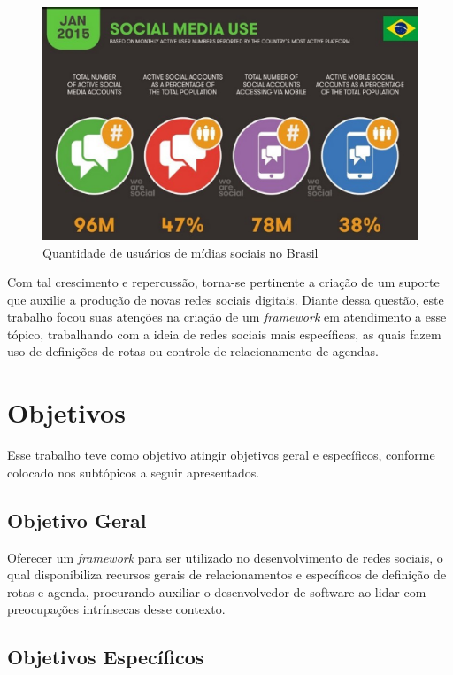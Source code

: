 \begin{figure}[!h]
	\centering
	\includegraphics[scale=0.4]{figuras/introducao/brasil.eps}
	\caption[Quantidade de usuários de mídias sociais no Brasil]{Quantidade de usuários de mídias sociais no Brasil \cite{wearesocial:2015}}
	\label{brasil}
\end{figure}

Com tal crescimento e repercussão, torna-se pertinente a criação de um suporte que auxilie a produção de novas redes sociais digitais. Diante dessa questão, este trabalho focou suas atenções na criação de um \textit{framework} em atendimento a esse tópico, trabalhando com a ideia de redes sociais mais específicas, as quais fazem uso de definições de rotas ou controle de relacionamento de agendas.

\section{Objetivos}

Esse trabalho teve como objetivo atingir objetivos geral e específicos, conforme colocado nos subtópicos a seguir apresentados.

\subsection{Objetivo Geral}

Oferecer um \textit{framework} para ser utilizado no desenvolvimento de redes sociais, o qual disponibiliza recursos gerais de relacionamentos e específicos de definição de rotas e agenda, procurando auxiliar o desenvolvedor de software ao lidar com preocupações intrínsecas desse contexto.

\subsection{Objetivos Específicos}

